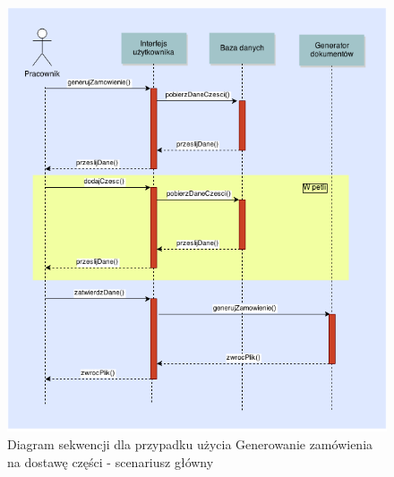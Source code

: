 \begin{figure}[h!]
    \includegraphics[width=\textwidth,
    height=0.7\textheight]{graphics/UseCase/Czesci/GenerowanieZamowieniaSD.png}
  \caption{Diagram sekwencji dla przypadku użycia Generowanie zamówienia na dostawę części - scenariusz główny}
\end{figure}